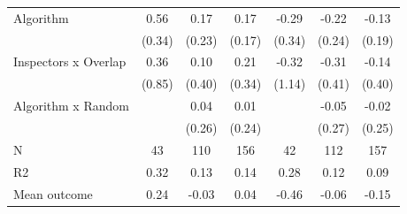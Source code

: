 \begin{tabular}{lccc|ccc}
Algorithm   &        0.56         &        0.17         &        0.17         &       -0.29         &       -0.22         &       -0.13         \\
            &      (0.34)         &      (0.23)         &      (0.17)         &      (0.34)         &      (0.24)         &      (0.19)         \\
\addlinespace
Inspectors x Overlap&        0.36         &        0.10         &        0.21         &       -0.32         &       -0.31         &       -0.14         \\
            &      (0.85)         &      (0.40)         &      (0.34)         &      (1.14)         &      (0.41)         &      (0.40)         \\
\addlinespace
Algorithm x Random&                     &        0.04         &        0.01         &                     &       -0.05         &       -0.02         \\
            &                     &      (0.26)         &      (0.24)         &                     &      (0.27)         &      (0.25)         \\
\midrule
N           &          43         &         110         &         156         &          42         &         112         &         157         \\
R2          &        0.32         &        0.13         &        0.14         &        0.28         &        0.12         &        0.09         \\
Mean outcome&        0.24         &       -0.03         &        0.04         &       -0.46         &       -0.06         &       -0.15         \\
\bottomrule \end{tabular}
